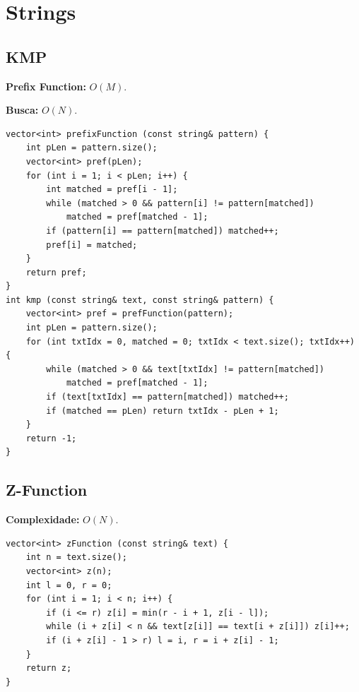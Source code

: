 \section{Strings}

\subsection{KMP}

\textbf{Prefix Function:} $O(M)$.

\textbf{Busca:} $O(N)$.

\begin{lstlisting}
vector<int> prefixFunction (const string& pattern) {
    int pLen = pattern.size();
    vector<int> pref(pLen);
    for (int i = 1; i < pLen; i++) {
        int matched = pref[i - 1];
        while (matched > 0 && pattern[i] != pattern[matched]) 
            matched = pref[matched - 1];
        if (pattern[i] == pattern[matched]) matched++;
        pref[i] = matched;
    }
    return pref;
}
int kmp (const string& text, const string& pattern) {
    vector<int> pref = prefFunction(pattern);
    int pLen = pattern.size();
    for (int txtIdx = 0, matched = 0; txtIdx < text.size(); txtIdx++) {
        while (matched > 0 && text[txtIdx] != pattern[matched])
            matched = pref[matched - 1];
        if (text[txtIdx] == pattern[matched]) matched++;
        if (matched == pLen) return txtIdx - pLen + 1;
    }
    return -1;
}
\end{lstlisting}



\subsection{Z-Function}

\textbf{Complexidade:} $O(N)$.

\begin{lstlisting}
vector<int> zFunction (const string& text) {
    int n = text.size();
    vector<int> z(n);
    int l = 0, r = 0;
    for (int i = 1; i < n; i++) {
        if (i <= r) z[i] = min(r - i + 1, z[i - l]);
        while (i + z[i] < n && text[z[i]] == text[i + z[i]]) z[i]++;
        if (i + z[i] - 1 > r) l = i, r = i + z[i] - 1;
    }
    return z;
}
\end{lstlisting}